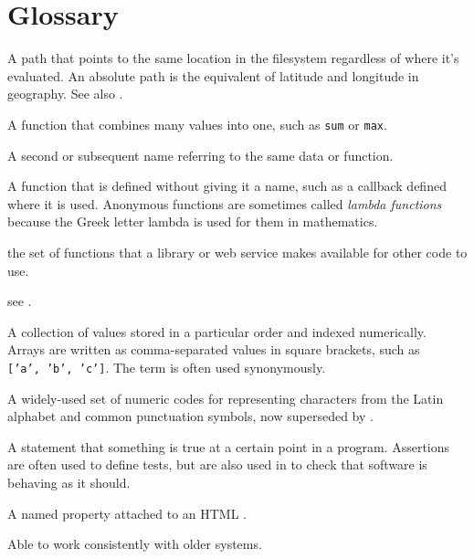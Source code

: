 \chapter{Glossary}\label{s:gloss}

\begin{description}

A path that points to the same location in the filesystem regardless of where
it's evaluated. An absolute path is the equivalent of latitude and longitude
in geography. See also .

A function that combines many values into one, such as \texttt{sum} or \texttt{max}.

A second or subsequent name referring to the same data or function.

A function that is defined without giving it a name, such as a callback
defined where it is used. Anonymous functions are sometimes called \emph{lambda
functions} because the Greek letter lambda is used for them in mathematics.

the set of functions that a library or web service makes available for other code to use.

see .

A collection of values stored in a particular order and indexed numerically.
Arrays are written as comma-separated values in square brackets, such as
\texttt{['a',\ 'b',\ 'c']}. The term  is often used synonymously.

A widely-used set of numeric codes for representing characters from the Latin
alphabet and common punctuation symbols, now superseded by
.

A statement that something is true at a certain point in a program.
Assertions are often used to define tests,
but are also used in  to check that software is behaving as it should.

A named property attached to an HTML .

Able to work consistently with older systems.


\end{description}
